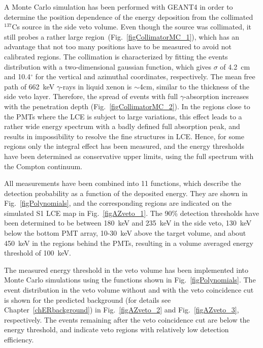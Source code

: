 A Monte Carlo simulation has been performed with GEANT4 in order to determine the position dependence of the energy deposition from the collimated $^{137}$Cs source in the side veto volume. Even though the source was collimated, it still probes a rather large region~(Fig.~\ref{figCollimatorMC_1}), which has an advantage that not too many positions have to be measured to avoid not calibrated regions. The collimation is characterized by fitting the events distribution with a two-dimensional gaussian function, which gives $\sigma$ of 4.2~cm and 10.4$^{\circ}$ for the vertical and azimuthal coordinates, respectively. The mean free path of 662~keV $\gamma$-rays in liquid xenon is $\sim$4cm, similar to the thickness of the side veto layer. Therefore, the spread of events with full $\gamma$-absorption increases with the penetration depth (Fig.~\ref{figCollimatorMC_2}). In the regions close to the PMTs where the LCE is subject to large variations, this effect leads to a rather wide energy spectrum with a badly defined full absorption peak, and results in impossibility to resolve the fine structures in LCE. Hence, for some regions only the integral effect has been measured, and the energy thresholds have been determined as conservative upper limits, using the full spectrum with the Compton continuum.

All measurements have been combined into 11 functions, which describe the detection probability as a function of the deposited energy. They are shown in Fig.~\ref{figPolynomials}, and the corresponding regions are indicated on the simulated S1 LCE map in Fig.~\ref{figAZveto_1}. The 90\% detection thresholds have been determined to be between 180~keV and 235~keV in the side veto, 130~keV below the bottom PMT array, 10-30~keV above the target volume, and about 450~keV in the regions behind the PMTs, resulting in a volume averaged energy threshold of 100~keV.

The measured energy threshold in the veto volume has been implemented into Monte Carlo simulations using the functions shown in Fig.~\ref{figPolynomials}. The event distribution in the veto volume without and with the veto coincidence cut is shown for the predicted background (for details see Chapter~\ref{chERbackground}) in Fig.~\ref{figAZveto_2} and Fig.~\ref{figAZveto_3}, respectively. The events remaining after the veto coincidence cut are below the energy threshold, and indicate veto regions with relatively low detection efficiency.

